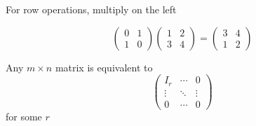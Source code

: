 \documentclass[a4paper]{article}
\begin{document}
For row operations, multiply on the left

\begin{ex}
\[ \begin{pmatrix}
0 & 1 \\
1 & 0
\end{pmatrix} \begin{pmatrix}
1 & 2\\
3 & 4
\end{pmatrix} = \begin{pmatrix}
3 & 4\\
1 & 2
\end{pmatrix} \]	
\end{ex}




\begin{thm} Any $ m \times n $ matrix is equivalent to \[ \begin{pmatrix}
	I_{r} & \cdots & 0 \\
	\vdots & \ddots & \vdots \\
	0 & \cdots & 0  \end{pmatrix} \]  for some $ r $
	
\end{thm}
\end{document}
